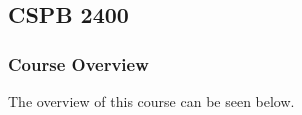 \clearpage

\renewcommand{\ChapTitle}{\CSPBCompSys}
\renewcommand{\SectionTitle}{CSPB 2400}

\chapter{\ChapTitle}
\section{\SectionTitle}

\subsection{Course Overview}

The overview of this course can be seen below.

